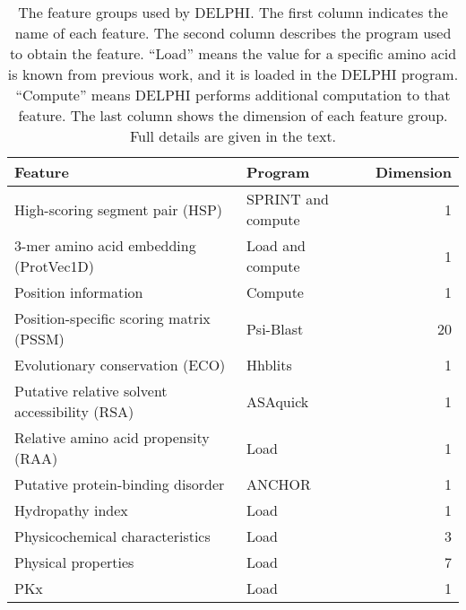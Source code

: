 \documentclass{bioinfo}
\begin{document}
\begin{methods}
\begin{table*}[htbp]
  \centering
  \caption{The feature groups used by DELPHI. The first column indicates the name of each feature. The second column describes the program used to obtain the feature. ``Load'' means the value for a specific amino acid is known from previous work, and it is loaded in the DELPHI program. ``Compute'' means DELPHI performs additional computation to that feature. The last column shows the dimension of each feature group. Full details are given in the text.}
    \begin{tabular}{p{23.93em}p{14.145em}r}
    \toprule
    Feature & Program & \multicolumn{1}{p{5.145em}}{Dimension} \\
    \midrule
    High-scoring segment pair (HSP) & SPRINT and compute & 1 \\
    3-mer amino acid embedding (ProtVec1D) & Load and compute & 1 \\
    Position information & Compute & 1 \\
    Position-specific scoring matrix (PSSM) & Psi-Blast & 20 \\
    Evolutionary conservation (ECO) & Hhblits & 1 \\
    Putative relative solvent accessibility (RSA) & ASAquick & 1 \\
    Relative amino acid propensity (RAA) & Load  & 1 \\
    Putative protein-binding disorder & ANCHOR & 1 \\
    Hydropathy index & Load  & 1 \\
    Physicochemical characteristics & Load  & 3 \\
    Physical properties & Load  & 7 \\
    PKx   & Load  & 1 \\
    \bottomrule
    \end{tabular}%
  \label{tab_feture}%
\end{table*}%


\end{methods}
\end{document}
